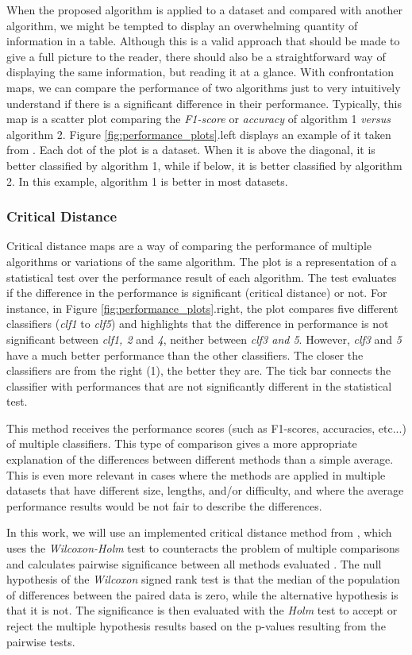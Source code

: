 When the proposed algorithm is applied to a dataset and compared with another algorithm, we might be tempted to display an overwhelming quantity of information in a table. Although this is a valid approach that should be made to give a full picture to the reader, there should also be a straightforward way of displaying the same information, but reading it at a glance. With confrontation maps, we can compare the performance of two algorithms just to very intuitively understand if there is a significant difference in their performance. Typically, this map is a scatter plot comparing the \textit{F1-score} or \textit{accuracy} of algorithm 1 \textit{versus} algorithm 2. Figure \ref{fig:performance_plots}.left displays an example of it taken from \cite{keogh_presentation}. Each dot of the plot is a dataset. When it is above the diagonal, it is better classified by algorithm 1, while if below, it is better classified by algorithm 2. In this example, algorithm 1 is better in most datasets.

\subsubsection{Critical Distance}

Critical distance maps are a way of comparing the performance of multiple algorithms or variations of the same algorithm. The plot is a representation of a statistical test over the performance result of each algorithm. The test evaluates if the difference in the performance is significant (critical distance) or not. For instance, in Figure \ref{fig:performance_plots}.right, the plot compares five different classifiers (\textit{clf1} to \textit{clf5}) and highlights that the difference in performance is not significant between \textit{clf1, 2} and \textit{4}, neither between \textit{clf3 and 5}. However, \textit{clf3} and \textit{5} have a much better performance than the other classifiers. The closer the classifiers are from the right (1), the better they are. The tick bar connects the classifier with performances that are not significantly different in the statistical test.
\par
This method receives the performance scores (such as F1-scores, accuracies, etc...) of multiple classifiers. This type of comparison gives a more appropriate explanation of the differences between different methods than a simple average. This is even more relevant in cases where the methods are applied in multiple datasets that have different size, lengths, and/or difficulty, and where the average performance results would be not fair to describe the differences.
\par
In this work, we will use an implemented critical distance method from \cite{critical_dif}, which uses the  \textit{Wilcoxon-Holm} test to counteracts the problem of multiple comparisons and calculates pairwise significance between all methods evaluated \cite{stat_test}. The null hypothesis of the \textit{Wilcoxon} signed rank test is that the median of the population of differences between the paired data is zero, while the alternative hypothesis is that it is not. The significance is then evaluated with the \textit{Holm} test to accept or reject the multiple hypothesis results based on the p-values resulting from the pairwise tests.